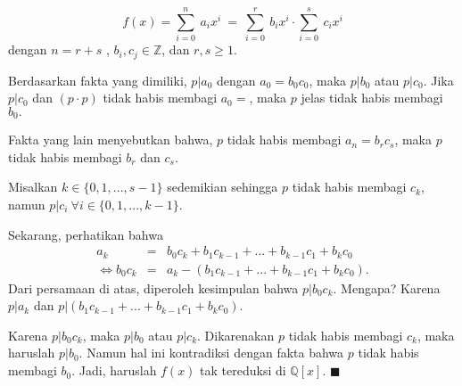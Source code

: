 	$$ f(x) = \sum^{n}_{i=0} \ a_ix^i~=~\sum^{r}_{i=0} \ b_ix^i \cdot \sum^{s}_{i=0} \ c_ix^i$$
	dengan $n=r+s$ , $b_i,c_j \in \mathbb{Z}$, dan $r,s \ge 1.$
\par 	Berdasarkan fakta yang dimiliki, $p|a_0$ dengan $a_0 = b_0c_0$, maka $p|b_0$ atau $p|c_0$. Jika $p|c_0$ dan $(p\cdot p)$ tidak habis membagi $a_0=$, maka $p$ jelas tidak habis membagi $b_0.$
\par 	Fakta yang lain menyebutkan bahwa, $p$ tidak habis membagi $a_n = b_rc_s$, maka $p$ tidak habis membagi $b_r$ dan $c_s$.
\par 	Misalkan $k\in \{0,1,...,s-1\}$ sedemikian sehingga $p$ tidak habis membagi $c_k$, namun $p|c_i~\forall i \in \{0,1,...,k-1\}.$
\par 	Sekarang, perhatikan bahwa
	$$\begin{array}{rcl}
	a_k &=& b_0c_k+b_1c_{k-1}+...+b_{k-1}c_1+b_kc_0\\
	\iff b_0c_k &=& a_k - (b_1c_{k-1}+...+b_{k-1}c_1+b_kc_0).
	\end{array}$$
	Dari persamaan di atas, diperoleh kesimpulan bahwa $p|b_0c_k$. Mengapa? Karena $p|a_k$ dan $p|(b_1c_{k-1}+...+b_{k-1}c_1+b_kc_0)$.
\par 	Karena $p|b_0c_k$, maka $p|b_0$ atau $p|c_k$. Dikarenakan $p$ tidak habis membagi $c_k$, maka haruslah $p|b_0$. Namun hal ini kontradiksi dengan fakta bahwa $p$ tidak habis membagi $b_0$. Jadi, haruslah $f(x)$ tak tereduksi di $\mathbb{Q}[x]$. $\blacksquare$
\\